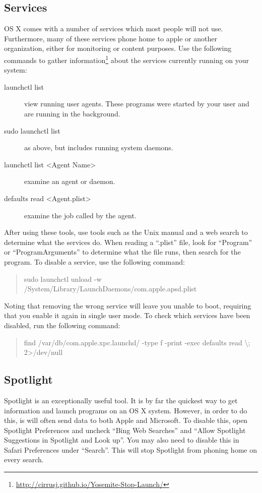 \documentclass[a4paper,11pt]{report}
\begin{document}
			\subsection{Services}
				OS X comes with a number of services which most people will not use. 
				Furthermore, many of these services phone home to apple or another organization, either for monitoring or content purposes. 
				Use the following commands to gather information\footnote{\url{http://cirrusj.github.io/Yosemite-Stop-Launch/}} about the services currently running on your system:
				\begin{description}
					\item[launchctl list]
						view running user agents. 
						These programs were started by your user and are running in the background. 
					\item[sudo launchctl list]
						as above, but includes running system daemons.
					\item[launchctl list <Agent Name>]
						examine an agent or daemon.
					\item[defaults read <Agent.plist>]
						examine the job called by the agent. 
				\end{description}
				After using these tools, use tools such as the Unix manual and a web search to determine what the services do. 
				When reading a ``.plist'' file, look for ``Program'' or ``ProgramArguments'' to determine what the file runs, then search for the program. 
				To disable a service, use the following command:
				\begin{quote}
					sudo launchctl unload -w /System/Library/LaunchDaemons/com.apple.apsd.plist
				\end{quote}
				Noting that removing the wrong service will leave you unable to boot, requiring that you enable it again in single user mode.
				To check which services have been disabled, run the following command:
				\begin{quote}
					find /var/db/com.apple.xpc.launchd/ -type f -print -exec defaults read {} \textbackslash; 2>/dev/null
				\end{quote}
			\subsection{Spotlight}
				Spotlight is an exceptionally useful tool. 
				It is by far the quickest way to get information and launch programs on an OS X system. 
				However, in order to do this, is will often send data to both Apple and Microsoft. 
				To disable this, open Spotlight Preferences and uncheck ``Bing Web Searches'' and ``Allow Spotlight Suggestions in Spotlight and Look up''. 
				You may also need to disable this in Safari Preferences under ``Search''. 
				This will stop Spotlight from phoning home on every search. 
\end{document}
